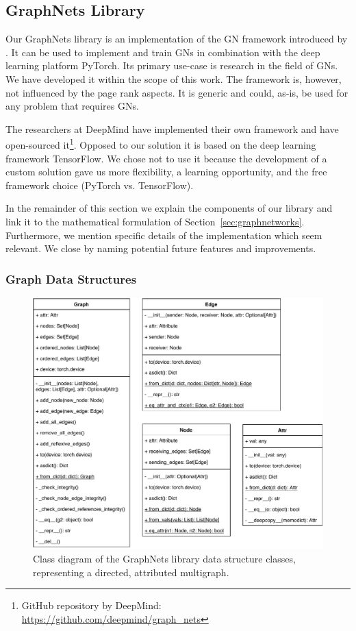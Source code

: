 \subsection{GraphNets Library}
\label{sec:gnlib}

Our GraphNets library is an implementation of the GN framework introduced by \cite{deepmind:graphnets}. It can be used to implement and train GNs in combination with the deep learning platform PyTorch. Its primary use-case is research in the field of GNs. We have developed it within the scope of this work. The framework is, however, not influenced by the page rank aspects. It is generic and could, as-is, be used for any problem that requires GNs.

The researchers at DeepMind have implemented their own framework and have open-sourced it\footnote{GitHub repository by DeepMind: \url{https://github.com/deepmind/graph_nets}}. Opposed to our solution it is based on the deep learning framework TensorFlow. We chose not to use it because the development of a custom solution gave us more flexibility, a learning opportunity, and the free framework choice (PyTorch vs. TensorFlow).

In the remainder of this section we explain the components of our library and link it to the mathematical formulation of Section~\ref{sec:graphnetworks}. Furthermore, we mention specific details of the implementation which seem relevant. We close by naming potential future features and improvements.

\subsubsection{Graph Data Structures}

\begin{figure}\centering
    \includegraphics[scale=0.65]{resources/graphnets-datastructs}
    \caption[Class diagram of the GraphNets library data structure classes]{Class diagram of the GraphNets library data structure classes, representing a directed, attributed multigraph.}\label{fig:classdiagramgndatastructs}
\end{figure}

